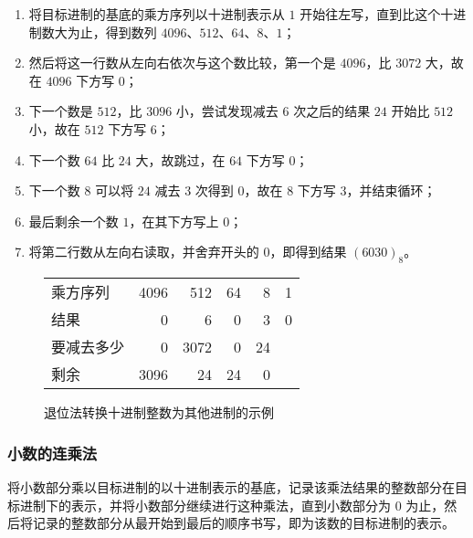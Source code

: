             \begin{enumerate}
                \item 将目标进制的基底的乘方序列以十进制表示从 $1$ 开始往左写，直到比这个十进制数大为止，得到数列 $4096$、$512$、$64$、$8$、$1$；
                \item 然后将这一行数从左向右依次与这个数比较，第一个是 $4096$，比 $3072$ 大，故在 $4096$ 下方写 $0$；
                \item 下一个数是 $512$，比 $3096$ 小，尝试发现减去 $6$ 次之后的结果 $24$ 开始比 $512$ 小，故在 $512$ 下方写 $6$；
                \item 下一个数 $64$ 比 $24$ 大，故跳过，在 $64$ 下方写 $0$；
                \item 下一个数 $8$ 可以将 $24$ 减去 $3$ 次得到 $0$，故在 $8$ 下方写 $3$，并结束循环；
                \item 最后剩余一个数 $1$，在其下方写上 $0$；
                \item 将第二行数从左向右读取，并舍弃开头的 $0$，即得到结果 $(6030)_8$。
            \end{enumerate}

            \begin{figure}
                \centering
                \begin{tabular}{lrrrrr}
                    乘方序列     & 4096 &  512 & 64 &  8 & 1 \\
                    结果         & 0    &    6 &  0 &  3 & 0 \\ \hline
                    要减去多少   & 0    & 3072 &  0 & 24 &   \\
                    剩余         & 3096 &   24 & 24 &  0 &
                \end{tabular}
                \caption{退位法转换十进制整数为其他进制的示例}
                \label{fig:NumberSystemBasics/positional-notation-conversion/from-decimal/integer-descending-subtraction/sample}
            \end{figure}
        \subsubsection{小数的连乘法}\label{subsubsec:NumberSystemBasics/positional-notation-conversion/from-decimal/fractal-long-multiplication}
            将小数部分乘以目标进制的以十进制表示的基底，记录该乘法结果的整数部分在目标进制下的表示，并将小数部分继续进行这种乘法，直到小数部分为 0 为止，然后将记录的整数部分从最开始到最后的顺序书写，即为该数的目标进制的表示。

